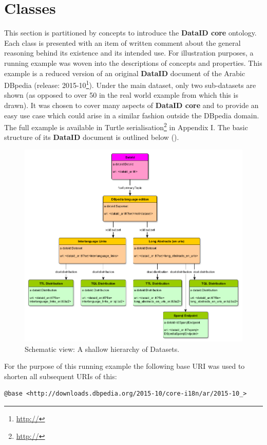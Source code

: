 \documentclass[a4paper,english,twoside,BCOR1.5cm,headsepline,DIV12,appendixprefix,final,12pt]{scrbook}
\newcommand{\dataid}{{\ttfamily\bfseries DataID}\xspace}
\newcommand{\core}{{\ttfamily\bfseries DataID core}\xspace}
\newcommand\footnoteurl[1]{\footnote{\scriptsize\url{#1}}}
\begin{document}
\pagebreak
\section{Classes} 
\label{sec:coreclasses}

This section is partitioned by concepts to introduce the \core ontology. Each class is presented with an item of written comment about the general reasoning behind its existence and its intended use.
For illustration purposes, a running example was woven into the descriptions of concepts and properties. This example is a reduced version of an original \dataid document of the Arabic DBpedia (release: 2015-10\footnoteurl{http://}). Under the main dataset, only two sub-datasets are shown (as opposed to over 50 in the real world example from which this is drawn). It was chosen to cover many aspects of \core and to provide an easy use case which could arise in a similar fashion outside the DBpedia domain. The full example is available in Turtle serialisation\footnoteurl{http://} in Appendix I. The basic structure of its \dataid document is outlined below ().

\begin{figure}[!htbp]
\centering
  \includegraphics[width=13cm]{images/ExampleStructure.png}
  \caption{Schematic view: A shallow hierarchy of Datasets.}
  \label{fig:example}
\end{figure}

For the purpose of this running example the following base URI was used to shorten all subsequent URIs of this:
\begin{lstlisting}[language=ttl,label=lst:graph,linewidth=\columnwidth,breaklines=true,basicstyle=\ttfamily\footnotesize]
@base <http://downloads.dbpedia.org/2015-10/core-i18n/ar/2015-10_>
\end{lstlisting}
\end{document}
